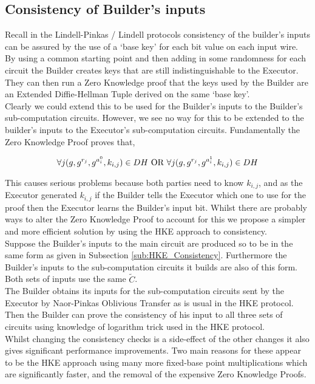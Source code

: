\documentclass[ %
                    author={Nicholas Tutte},
                supervisor={Prof. Nigel Smart},
                    degree={MEng},
                     title={Secure Two Party Computation},
                  subtitle={A practical comparison of recent protocols},
                      type={Research - GG1K},
                      year={2015} ]{dissertation}
\begin{document}
			\subsection{Consistency of Builder's inputs}
				Recall in the Lindell-Pinkas / Lindell protocols consistency of the builder's inputs can be assured by the use of a `base key' for each bit value on each input wire. By using a common starting point and then adding in some randomness for each circuit the Builder creates keys that are still indistinguishable to the Executor. They can then run a Zero Knowledge proof that the keys used by the Builder are an Extended Diffie-Hellman Tuple derived on the same `base key'.\\

				Clearly we could extend this to be used for the Builder's inputs to the Builder's sub-computation circuits. However, we see no way for this to be extended to the builder's inputs to the Executor's sub-computation circuits. Fundamentally the Zero Knowledge Proof proves that,
				
				$$\forall j (g, g^{r_j}, g^{a_i^0}, k_{i,j}) \in DH \textnormal{ OR } \forall j (g, g^{r_j}, g^{a_i^1}, k_{i,j}) \in DH$$

				This causes serious problems because both parties need to know $k_{i,j}$, and as the Executor generated $k_{i,j}$ if the Builder tells the Executor which one to use for the proof then the Executor learns the Builder's input bit. Whilst there are probably ways to alter the Zero Knowledge Proof to account for this we propose a simpler and more efficient solution by using the HKE approach to consistency.\\

				Suppose the Builder's inputs to the main circuit are produced so to be in the same form as given in Subsection \ref{sub:HKE_Consistency}. Furthermore the Builder's inputs to the sub-computation circuits it builds are also of this form. Both sets of inputs use the same $\tilde C$.\\

				The Builder obtains its inputs for the sub-computation circuits sent by the Executor by Naor-Pinkas Oblivious Transfer as is usual in the HKE protocol. Then the Builder can prove the consistency of his input to all three sets of circuits using knowledge of logarithm trick used in the HKE protocol.\\

				Whilst changing the consistency checks is a side-effect of the other changes it also gives significant performance improvements. Two main reasons for these appear to be the HKE approach using many more fixed-base point multiplications which are significantly faster, and the removal of the expensive Zero Knowledge Proofs.
\end{document}
